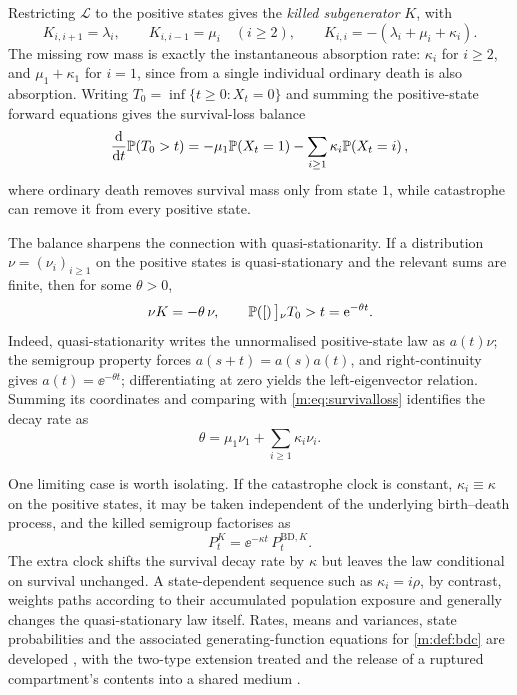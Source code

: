Restricting $\mathcal L$ to the positive states gives the \emph{killed
subgenerator} $K$, with
\begin{equation*}
K_{i,i+1}=\lambda_i,\qquad K_{i,i-1}=\mu_i\quad(i\ge2),
\qquad
K_{i,i}=-(\lambda_i+\mu_i+\kappa_i) .
\end{equation*}
The missing row mass is exactly the instantaneous absorption rate: $\kappa_i$
for $i\ge2$, and $\mu_1+\kappa_1$ for $i=1$, since from a single individual
ordinary death is also absorption. Writing
$T_0=\inf\{t\ge0:X_t=0\}$ and summing the positive-state forward equations gives
the survival-loss balance
\begin{equation}
\label{m:eq:survivalloss}
\frac{\mathrm{d} }{\mathrm{d} t}\mathbb{P}\!\left(T_0>t\right)
= -\mu_1\mathbb{P}\!\left(X_t=1\right) - \sum_{i\ge1}\kappa_i\mathbb{P}\!\left(X_t=i\right),
\end{equation}
where ordinary death removes survival mass only from state $1$, while
catastrophe can remove it from every positive state.

The balance sharpens the connection with quasi-stationarity. If a distribution
$\nu=(\nu_i)_{i\ge1}$ on the positive states is quasi-stationary and the
relevant sums are finite, then for some $\theta>0$,
\begin{equation}
\label{m:eq:qsdeigen}
\nu K = -\theta\,\nu,
\qquad
\mathbb{P}\!\left([\right)\big]{_\nu}{T_0>t} = \mathrm{e}^{-\theta t} .
\end{equation}
Indeed, quasi-stationarity writes the unnormalised positive-state law as
$a(t)\nu$; the semigroup property forces $a(s+t)=a(s)a(t)$, and
right-continuity gives $a(t)=\ee^{-\theta t}$; differentiating at zero yields
the left-eigenvector relation. Summing its coordinates and comparing with
\cref{m:eq:survivalloss} identifies the decay rate as
\begin{equation}
\label{m:eq:thetarate}
\theta = \mu_1\nu_1 + \sum_{i\ge1}\kappa_i\nu_i .
\end{equation}

One limiting case is worth isolating. If the catastrophe clock is constant,
$\kappa_i\equiv\kappa$ on the positive states, it may be taken independent of
the underlying birth--death process, and the killed semigroup factorises as
\begin{equation*}
P_t^{K} = \ee^{-\kappa t}\,P_t^{\mathrm{BD},K} .
\end{equation*}
The extra clock shifts the survival decay rate by $\kappa$ but leaves the law
conditional on survival unchanged. A state-dependent sequence such as
$\kappa_i=i\rho$, by contrast, weights paths according to their accumulated
population exposure and generally changes the quasi-stationary law itself.
Rates, means and variances, state probabilities and the associated
generating-function equations for \cref{m:def:bdc} are developed , with the two-type
extension treated  and
the release of a ruptured compartment's contents into a shared medium
.

\FloatBarrier
